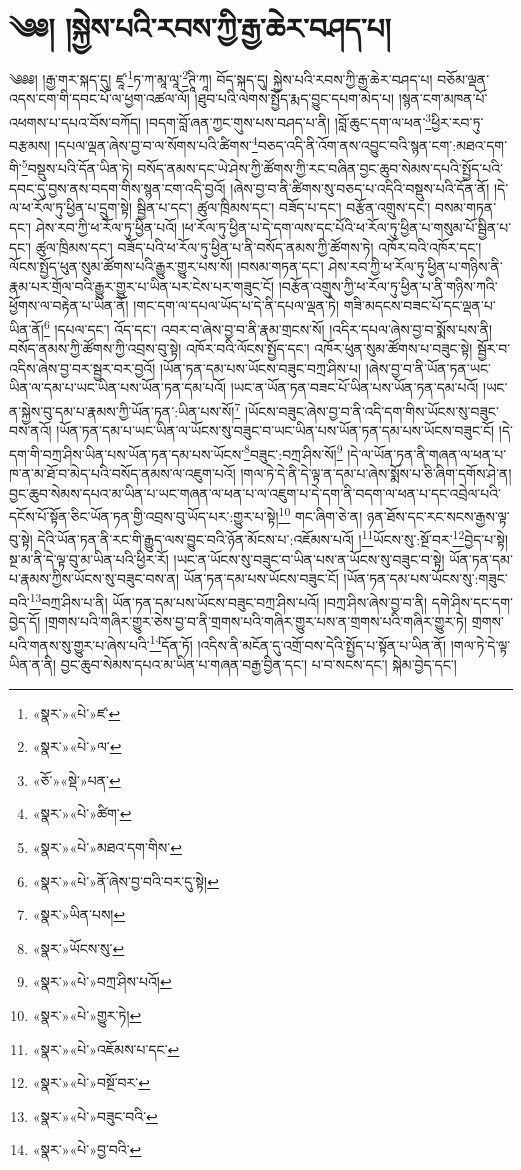 \chapter{༄༅། །སྐྱེས་པའི་རབས་ཀྱི་རྒྱ་ཆེར་བཤད་པ།}༄༅༅། །རྒྱ་གར་སྐད་དུ། ཛཱ་\footnote{«སྣར་»«པེ་»ཛ་}ཏ་ཀ་མཱ་ལཱ་\footnote{«སྣར་»«པེ་»ལ་}ཊཱི་ཀཱ། བོད་སྐད་དུ། སྐྱེས་པའི་རབས་ཀྱི་རྒྱ་ཆེར་བཤད་པ། བཅོམ་ལྡན་འདས་ངག་གི་དབང་པོ་ལ་ཕྱག་འཚལ་ལོ། །ཐུབ་པའི་ལེགས་སྤྱོད་རྨད་བྱུང་དཔག་མེད་པ། །སྙན་ངག་མཁན་པོ་འཕགས་པ་དཔའ་བོས་བཀོད། །བདག་བློ་ཞན་ཀྱང་གུས་པས་བཤད་པ་ནི། །བློ་ཆུང་དག་ལ་ཕན་\footnote{«ཅོ་»«སྡེ་»པན་}ཕྱིར་རབ་ཏུ་བརྩམས། །དཔལ་ལྡན་ཞེས་བྱ་བ་ལ་སོགས་པའི་ཚིགས་\footnote{«སྣར་»«པེ་»ཚིག་}བཅད་འདི་ནི་འོག་ནས་འབྱུང་བའི་སྙན་ངག་:མཐའ་དག་གི་\footnote{«སྣར་»«པེ་»མཐའ་དག་གིས་}བསྡུས་པའི་དོན་ཡིན་ཏེ། བསོད་ནམས་དང་ཡེ་ཤེས་ཀྱི་ཚོགས་ཀྱི་རང་བཞིན་བྱང་ཆུབ་སེམས་དཔའི་སྤྱོད་པའི་དབང་དུ་བྱས་ནས་བདག་གིས་སྙན་ངག་འདི་བྱའོ། །ཞེས་བྱ་བ་ནི་ཚིགས་སུ་བཅད་པ་འདིའི་བསྡུས་པའི་དོན་ནོ། །དེ་ལ་ཕ་རོལ་ཏུ་ཕྱིན་པ་དྲུག་སྟེ། སྦྱིན་པ་དང་། ཚུལ་ཁྲིམས་དང་། བཟོད་པ་དང་། བརྩོན་འགྲུས་དང་། བསམ་གཏན་དང་། ཤེས་རབ་ཀྱི་ཕ་རོལ་ཏུ་ཕྱིན་པའོ། །ཕ་རོལ་ཏུ་ཕྱིན་པ་དེ་དག་ལས་དང་པོའི་ཕ་རོལ་ཏུ་ཕྱིན་པ་གསུམ་པོ་སྦྱིན་པ་དང་། ཚུལ་ཁྲིམས་དང་། བཟོད་པའི་ཕ་རོལ་ཏུ་ཕྱིན་པ་ནི་བསོད་ནམས་ཀྱི་ཚོགས་ཏེ། འཁོར་བའི་འཁོར་དང་། ལོངས་སྤྱོད་ཕུན་སུམ་ཚོགས་པའི་རྒྱུར་གྱུར་པས་སོ། །བསམ་གཏན་དང་། ཤེས་རབ་ཀྱི་ཕ་རོལ་ཏུ་ཕྱིན་པ་གཉིས་ནི་རྣམ་པར་གྲོལ་བའི་རྒྱུར་གྱུར་པ་ཡིན་པར་ངེས་པར་གཟུང་ངོ། །བརྩོན་འགྲུས་ཀྱི་ཕ་རོལ་ཏུ་ཕྱིན་པ་ནི་གཉིས་ཀའི་ཕྱོགས་ལ་བརྟེན་པ་ཡིན་ནོ། །གང་དག་ལ་དཔལ་ཡོད་པ་དེ་ནི་དཔལ་ལྡན་ཏེ། གཟི་མདངས་བཟང་པོ་དང་ལྡན་པ་ཡིན་ནོ།\footnote{«སྣར་»«པེ་»ནོ་ཞེས་བྱ་བའི་བར་དུ་སྟེ།} །དཔལ་དང་། འོད་དང་། འབར་བ་ཞེས་བྱ་བ་ནི་རྣམ་གྲངས་སོ། །འདིར་དཔལ་ཞེས་བྱ་བ་སྨོས་པས་ནི། བསོད་ནམས་ཀྱི་ཚོགས་ཀྱི་འབྲས་བུ་སྟེ། འཁོར་བའི་ལོངས་སྤྱོད་དང་། འཁོར་ཕུན་སུམ་ཚོགས་པ་བཟུང་སྟེ། སྦྱོར་བ་འདིས་ཞེས་བྱ་བར་སྦྱར་བར་བྱའོ། །ཡོན་ཏན་དམ་པས་ཡོངས་བཟུང་བཀྲ་ཤིས་པ། །ཞེས་བྱ་བ་ནི་ཡོན་ཏན་ཡང་ཡིན་ལ་དམ་པ་ཡང་ཡིན་པས་ཡོན་ཏན་དམ་པའོ། །ཡང་ན་ཡོན་ཏན་བཟང་པོ་ཡིན་པས་ཡོན་ཏན་དམ་པའོ། །ཡང་ན་སྐྱེས་བུ་དམ་པ་རྣམས་ཀྱི་ཡོན་ཏན་:ཡིན་པས་སོ།\footnote{«སྣར་»ཡིན་པས།} །ཡོངས་བཟུང་ཞེས་བྱ་བ་ནི་འདི་དག་གིས་ཡོངས་སུ་བཟུང་བས་ནའོ། །ཡོན་ཏན་དམ་པ་ཡང་ཡིན་ལ་ཡོངས་སུ་བཟུང་བ་ཡང་ཡིན་པས་ཡོན་ཏན་དམ་པས་ཡོངས་བཟུང་ངོ། །དེ་དག་གི་བཀྲ་ཤིས་ཡིན་པས་ཡོན་ཏན་དམ་པས་ཡོངས་\footnote{«སྣར་»ཡོངས་སུ་}བཟུང་:བཀྲ་ཤིས་སོ།\footnote{«སྣར་»«པེ་»བཀྲ་ཤིས་པའོ།} །དེ་ལ་ཡོན་ཏན་ནི་གཞན་ལ་ཕན་པ་ཁ་ན་མ་ཐོ་བ་མེད་པའི་བསོད་ནམས་ལ་འཇུག་པའོ། །གལ་ཏེ་དེ་ནི་དེ་ལྟ་ན་དམ་པ་ཞེས་སྨོས་པ་ཅི་ཞིག་དགོས་ཤེ་ན། བྱང་ཆུབ་སེམས་དཔའ་མ་ཡིན་པ་ཡང་གཞན་ལ་ཕན་པ་ལ་འཇུག་པ་དེ་དག་ནི་བདག་ལ་ཕན་པ་དང་འབྲེལ་པའི་དངོས་པོ་སྟོན་ཅིང་ཡོན་ཏན་གྱི་འབྲས་བུ་ཡོད་པར་:གྱུར་པ་སྟེ།\footnote{«སྣར་»«པེ་»གྱུར་ཏེ།} གང་ཞིག་ཅེ་ན། ཉན་ཐོས་དང་རང་སངས་རྒྱས་ལྟ་བུ་སྟེ། དེའི་ཡོན་ཏན་ནི་རང་གི་རྒྱུད་ལས་བྱུང་བའི་ཉོན་མོངས་པ་:འཇོམས་པའོ། །\footnote{«སྣར་»«པེ་»འཇོམས་པ་དང་}ཡོངས་སུ་:སྔོ་བར་\footnote{«སྣར་»«པེ་»བསྔོ་བར་}བྱེད་པ་སྟེ། སྔ་མ་ནི་དེ་ལྟ་བུ་མ་ཡིན་པའི་ཕྱིར་རོ། །ཡང་ན་ཡོངས་སུ་བཟུང་བ་ཡིན་པས་ན་ཡོངས་སུ་བཟུང་བ་སྟེ། ཡོན་ཏན་དམ་པ་རྣམས་ཀྱིས་ཡོངས་སུ་བཟུང་བས་ན། ཡོན་ཏན་དམ་པས་ཡོངས་བཟུང་ངོ། །ཡོན་ཏན་དམ་པས་ཡོངས་སུ་:གཟུང་བའི་\footnote{«སྣར་»«པེ་»བཟུང་བའི་}བཀྲ་ཤིས་པ་ནི། ཡོན་ཏན་དམ་པས་ཡོངས་བཟུང་བཀྲ་ཤིས་པའོ། །བཀྲ་ཤིས་ཞེས་བྱ་བ་ནི། དགེ་ཤིས་དང་དག་བྱེད་དོ། །གྲགས་པའི་གཞིར་གྱུར་ཅེས་བྱ་བ་ནི་གྲགས་པའི་གཞིར་གྱུར་པས་ན་གྲགས་པའི་གཞིར་གྱུར་ཏེ། གྲགས་པའི་གནས་སུ་གྱུར་པ་ཞེས་པའི་\footnote{«སྣར་»«པེ་»བྱ་བའི་}དོན་ཏོ། །འདིས་ནི་མངོན་དུ་འགྲོ་བས་དེའི་སྤྱོད་པ་སྟོན་པ་ཡིན་ནོ། །གལ་ཏེ་དེ་ལྟ་ཡིན་ན་ནི། བྱང་ཆུབ་སེམས་དཔའ་མ་ཡིན་པ་གཞན་བརྒྱ་བྱིན་དང་། པ་བ་སངས་དང་། སྐེམ་བྱེད་དང་། 